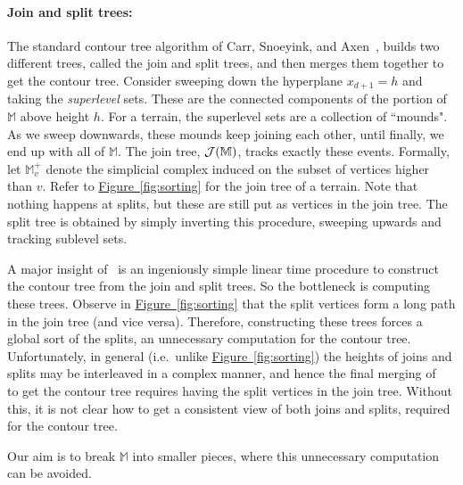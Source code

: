 \documentclass[11pt]{article}
\newcommand{\myparagraph}[1]{\paragraph{#1}}
\theoremstyle{definition}
\newcommand{\cJ}{{\cal J}}
\newcommand{\MM}{\mathbb{M}}
\newcommand{\Fig}[1]{\hyperref[fig:#1]{Figure~\ref*{fig:#1}}} %
\begin{document}
\myparagraph{Join and split trees:}
The standard contour tree algorithm of Carr, Snoeyink, and Axen~\cite{csa-cctad-03}, builds
two different trees, called the join and split trees, and then merges them together to get the contour tree.
Consider sweeping down the hyperplane $x_{d+1} = h$ and taking the \emph{superlevel} sets. These 
are the connected components of the portion of $\MM$ above height $h$. For a terrain, the superlevel
sets are a collection of ``mounds". As we sweep downwards, these mounds keep joining each other,
until finally, we end up with all of $\MM$. The join tree, $\cJ(\MM)$, tracks exactly these events. 
Formally, let $\MM^+_v$ denote the simplicial complex induced on the subset of 
vertices higher than $v$. 
Refer to \Fig{sorting} for the join tree of a terrain. Note that nothing happens at splits, but these
are still put as vertices in the join tree. The split tree
is obtained by simply inverting this procedure, sweeping upwards and tracking sublevel sets.

A major insight of~\cite{csa-cctad-03} is an ingeniously simple linear time procedure to construct
the contour tree from the join and split trees. So the bottleneck is computing these trees. Observe
in \Fig{sorting} that the split vertices form a long path in the join tree (and vice versa). Therefore, constructing
these trees forces a global sort of the splits, an unnecessary computation for the contour tree. Unfortunately, in general (i.e.\ unlike \Fig{sorting}) 
the heights of joins and splits may be interleaved in a complex manner, and hence the final merging of~\cite{csa-cctad-03}
to get the contour tree requires having the split vertices in the join tree. Without
this, it is not clear how to get a consistent view of both joins and splits, required for the contour tree.

Our aim is to break $\MM$ into smaller pieces, where this unnecessary computation can be avoided.
\end{document}
